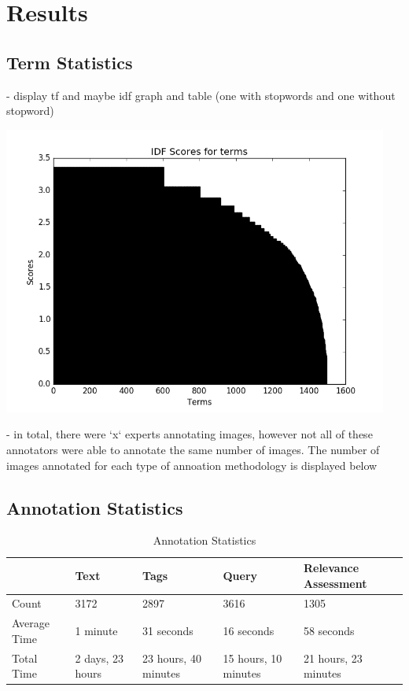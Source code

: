 \chapter{Results}

\section{Term Statistics}

- display tf and maybe idf graph and table (one with stopwords and one without stopword)

\includegraphics[width=0.95\textwidth]{images/graphs/idf}

- in total, there were `x` experts annotating images, however not all of these annotators were able to annotate the same number of images. The number of images annotated for each type of annoation methodology is displayed below


\section{Annotation Statistics}

\begin{table}[htb]
    \centering
    \begin{adjustbox}{center}
    \begin{tabular}{ | l | l | l | l | p{5cm} |}
    \hline
    & Text & Tags & Query & Relevance Assessment \\ \hline
    Count & 3172 & 2897 & 3616 & 1305 \\ \hline
    Average Time & 1 minute & 31 seconds & 16 seconds & 58 seconds \\ \hline
    Total Time & 2 days, 23 hours & 23 hours, 40 minutes & 15 hours, 10 minutes & 21 hours, 23 minutes \\ \hline
    \end{tabular}
    \end{adjustbox}
    \caption{Annotation Statistics}
\end{table}


